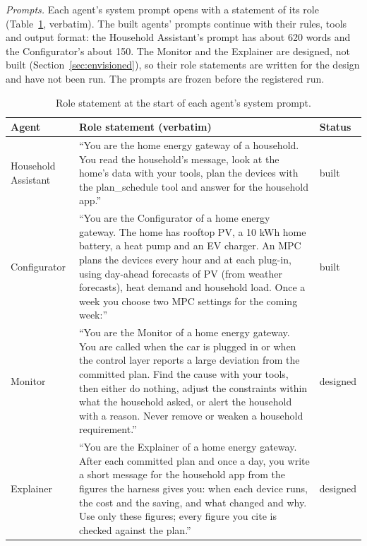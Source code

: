 \textit{Prompts.} Each agent's system prompt opens with a statement of
its role (Table~\ref{tab:prompts}, verbatim). The built agents' prompts
continue with their rules, tools and output format: the Household
Assistant's prompt has about 620 words and the Configurator's about
150. The Monitor and the Explainer are designed, not built
(Section~\ref{sec:envisioned}), so their role statements are written
for the design and have not been run. The prompts are frozen before the
registered run.

\begin{table}[htbp]
\caption{Role statement at the start of each agent's system prompt.}
\label{tab:prompts}
\small
\begin{tabularx}{\textwidth}{@{}>{\raggedright\arraybackslash}p{2.5cm}X>{\raggedright\arraybackslash}p{1.6cm}@{}}
\toprule
Agent & Role statement (verbatim) & Status \\
\midrule
Household Assistant & ``You are the home energy gateway of a household.
You read the household's message, look at the home's data with your
tools, plan the devices with the plan\_schedule tool and answer for the
household app.'' & built \\[4pt]
Configurator & ``You are the Configurator of a home energy gateway. The
home has rooftop PV, a 10 kWh home battery, a
heat pump and an EV charger. An MPC plans the devices every hour and
at each plug-in, using day-ahead forecasts of PV (from weather
forecasts), heat demand and household load. Once a week you choose two
MPC settings for the coming week:'' & built \\[4pt]
Monitor & ``You are the Monitor of a home energy gateway. You are called
when the car is plugged in or when the control layer reports a large
deviation from the committed plan. Find the cause with your tools, then
either do nothing, adjust the constraints within what the household
asked, or alert the household with a reason. Never remove or weaken a
household requirement.'' & designed \\[4pt]
Explainer & ``You are the Explainer of a home energy gateway. After each
committed plan and once a day, you write a short message for the
household app from the figures the harness gives you: when each device
runs, the cost and the saving, and what changed and why. Use only these
figures; every figure you cite is checked against the plan.'' &
designed \\
\bottomrule
\end{tabularx}
\end{table}

